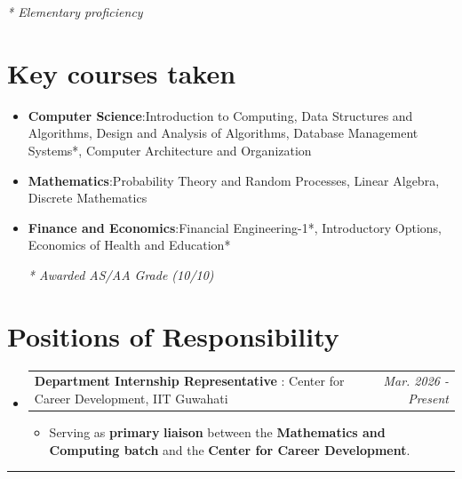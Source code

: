 \documentclass[a4paper,11pt]{article}
\makeatletter
\newcommand{\resumeItem}[2]{
  \item{
    \textbf{#1}{:\hspace{0.5mm}#2 \vspace{-0.5mm}}
  }
}
\newcommand{\resumePOR}[3]{
\vspace{0.5mm}\item
    \begin{tabular*}{0.97\textwidth}[t]{l@{\extracolsep{\fill}}r}
        \textbf{#1} :\hspace{0.3mm}#2 & \textit{\small{#3}} 
    \end{tabular*}
    \vspace{-2mm}
}
\newcommand{\resumeSubItem}[2]{\resumeItem{#1}{#2}\vspace{-4pt}}
\newcommand{\resumeSubHeadingListStart}{\begin{itemize}[leftmargin=*,labelsep=0mm]}
\newcommand{\resumeHeadingSkillStart}{\begin{itemize}[leftmargin=*,itemsep=1.7mm, rightmargin=2ex]}
\newcommand{\resumeItemListStart}{\begin{justify}\begin{itemize}[leftmargin=3ex, rightmargin=2ex, noitemsep,labelsep=1.2mm,itemsep=-mm]\small}
\newcommand{\resumeSubHeadingListEnd}{\end{itemize}\vspace{2mm}}
\newcommand{\resumeHeadingSkillEnd}{\end{itemize}\vspace{-2mm}}
\newcommand{\resumeItemListEnd}{\end{itemize}\end{justify}\vspace{-3mm}}
\makeatother
\begin{document}
\vspace{-3mm}
\begin{flushright}
\footnotesize\textit{* Elementary proficiency}
\end{flushright}

\vspace{-10mm}
\section{Key courses taken}
\resumeHeadingSkillStart
\resumeSubItem{Computer Science}
 {Introduction to Computing, Data Structures and Algorithms, Design and Analysis of Algorithms, Database Management Systems*, Computer Architecture and Organization}
 \resumeSubItem{Mathematics} %
    {Probability Theory and Random Processes, Linear Algebra, Discrete Mathematics}
 \resumeSubItem{Finance and Economics} %
    {Financial Engineering-1*, Introductory Options, Economics of Health and Education*}
\vspace{-1mm}
\begin{flushright}
\footnotesize\textit{* Awarded AS/AA Grade (10/10)}
\end{flushright}

 \resumeHeadingSkillEnd
\vspace{-8.5mm}

\section{Positions of Responsibility}
\vspace{-1mm}
\resumeSubHeadingListStart
\resumePOR{Department Internship Representative} %
    { Center for Career Development, IIT Guwahati} %
    {Mar. 2026 - Present} %
\vspace{-0.5mm}
    \resumeItemListStart
        \item {Serving as \textbf{primary} \textbf{liaison} between the \textbf{Mathematics and Computing batch} and the \textbf{Center for Career Development}.}
        
    \resumeItemListEnd

\resumeSubHeadingListEnd
\vspace{-4mm}

\hspace*{-5mm}\rule{1.035\textwidth}{0.1mm}


\end{document}
